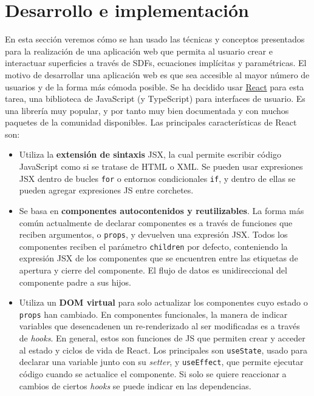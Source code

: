 
\chapter{Desarrollo e implementación}
En esta sección veremos cómo se han usado las técnicas y conceptos presentados para la realización de una aplicación web que permita al usuario crear e interactuar superficies a través de SDFs, ecuaciones implícitas y paramétricas. El motivo de desarrollar una aplicación web es que sea accesible al mayor número de usuarios y de la forma más cómoda posible. Se ha decidido usar \href{https://es.reactjs.org/}{React} para esta tarea, una biblioteca de JavaScript (y TypeScript) para interfaces de usuario. Es una librería muy popular, y por tanto muy bien documentada y con muchos paquetes de la comunidad disponibles. Las principales características de React son:
\begin{itemize}
    \item Utiliza la \textbf{extensión de sintaxis} JSX, la cual permite escribir código JavaScript como si se tratase de HTML o XML. Se pueden usar expresiones JSX dentro de bucles \texttt{for} o entornos condicionales \texttt{if}, y dentro de ellas se pueden agregar expresiones JS entre corchetes. 
    \item Se basa en \textbf{componentes autocontenidos y reutilizables}. La forma más común actualmente de declarar componentes es a través de funciones que reciben argumentos, o \texttt{props}, y devuelven una expresión JSX. Todos los componentes reciben el parámetro \texttt{children} por defecto, conteniendo la expresión JSX de los componentes que se encuentren entre las etiquetas de apertura y cierre del componente. El flujo de datos es unidireccional del componente padre a sus hijos.
    \item Utiliza un \textbf{DOM virtual} para solo actualizar los componentes cuyo estado o \texttt{props} han cambiado. En componentes funcionales, la manera de indicar variables que desencadenen un re-renderizado al ser modificadas es a través de \textit{hooks}. En general, estos son funciones de JS que permiten crear y acceder al estado y ciclos de vida de React. Los principales son \texttt{useState}, usado para declarar una variable junto con su \textit{setter}, y \texttt{useEffect}, que permite ejecutar código cuando se actualice el componente. Si solo se quiere reaccionar a cambios de ciertos \textit{hooks} se puede indicar en las dependencias.
\end{itemize}
